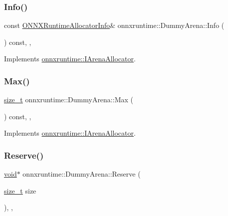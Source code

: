 \subsubsection{\texorpdfstring{Info()}{Info()}}
{\footnotesize\ttfamily const \mbox{\hyperlink{structONNXRuntimeAllocatorInfo}{O\+N\+N\+X\+Runtime\+Allocator\+Info}}\& onnxruntime\+::\+Dummy\+Arena\+::\+Info (\begin{DoxyParamCaption}{ }\end{DoxyParamCaption}) const\hspace{0.3cm}{\ttfamily [inline]}, {\ttfamily [override]}, {\ttfamily [virtual]}}



Implements \mbox{\hyperlink{classonnxruntime_1_1IArenaAllocator_a4eb52bb1236cf59aec91161156286ba0}{onnxruntime\+::\+I\+Arena\+Allocator}}.

\mbox{\label{classonnxruntime_1_1DummyArena_ae4edcff60bded3201a9852c6bc935276}} 
\subsubsection{\texorpdfstring{Max()}{Max()}}
{\footnotesize\ttfamily \mbox{\hyperlink{mlasi_8h_a503efbc1c6e50825320ad909366b78ab}{size\+\_\+t}} onnxruntime\+::\+Dummy\+Arena\+::\+Max (\begin{DoxyParamCaption}{ }\end{DoxyParamCaption}) const\hspace{0.3cm}{\ttfamily [inline]}, {\ttfamily [override]}, {\ttfamily [virtual]}}



Implements \mbox{\hyperlink{classonnxruntime_1_1IArenaAllocator_a09710487a52f42135ee804b7d2e2ed71}{onnxruntime\+::\+I\+Arena\+Allocator}}.

\mbox{\label{classonnxruntime_1_1DummyArena_a8bfa97292cc0bac6cc6c18e913bdcb4c}} 
\subsubsection{\texorpdfstring{Reserve()}{Reserve()}}
{\footnotesize\ttfamily \mbox{\hyperlink{mlasi_8h_a88f941d423cb2a819b70a1358982b1a6}{void}}$\ast$ onnxruntime\+::\+Dummy\+Arena\+::\+Reserve (\begin{DoxyParamCaption}\item[{\mbox{\hyperlink{mlasi_8h_a503efbc1c6e50825320ad909366b78ab}{size\+\_\+t}}}]{size }\end{DoxyParamCaption})\hspace{0.3cm}{\ttfamily [inline]}, {\ttfamily [override]}, {\ttfamily [virtual]}}



